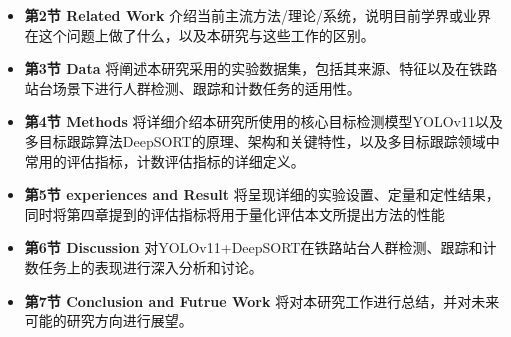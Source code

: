\begin{itemize}
  \item \textbf{第2节 Related Work}  介绍当前主流方法/理论/系统，说明目前学界或业界在这个问题上做了什么，以及本研究与这些工作的区别。
  \item \textbf{第3节 Data} 将阐述本研究采用的实验数据集，包括其来源、特征以及在铁路站台场景下进行人群检测、跟踪和计数任务的适用性。
  \item \textbf{第4节 Methods} 将详细介绍本研究所使用的核心目标检测模型YOLOv11以及多目标跟踪算法DeepSORT的原理、架构和关键特性，以及多目标跟踪领域中常用的评估指标，计数评估指标的详细定义。
  \item \textbf{第5节 experiences and Result } 将呈现详细的实验设置、定量和定性结果，同时将第四章提到的评估指标将用于量化评估本文所提出方法的性能
  \item \textbf{第6节 Discussion} 对YOLOv11+DeepSORT在铁路站台人群检测、跟踪和计数任务上的表现进行深入分析和讨论。
  \item \textbf{第7节 Conclusion and Futrue Work} 将对本研究工作进行总结，并对未来可能的研究方向进行展望。
\end{itemize}
\fi